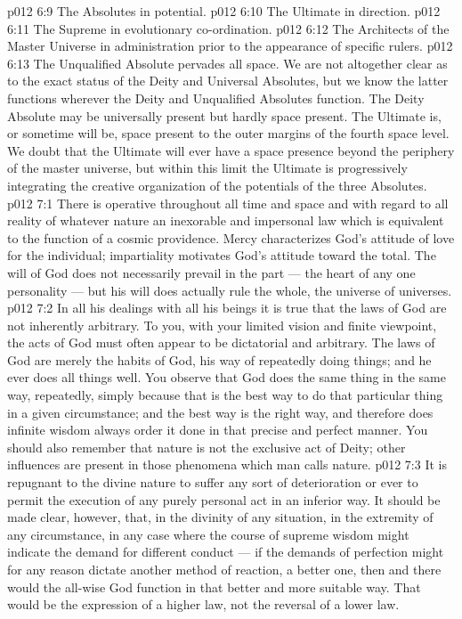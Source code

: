 \vs p012 6:9 \bibnobreakspace The Absolutes in potential.
\vs p012 6:10 \bibnobreakspace The Ultimate in direction.
\vs p012 6:11 \bibnobreakspace The Supreme in evolutionary co\hyp{}ordination.
\vs p012 6:12 \bibnobreakspace The Architects of the Master Universe in administration prior to the appearance of specific rulers.
\vs p012 6:13 \pc The Unqualified Absolute pervades all space. We are not altogether clear as to the exact status of the Deity and Universal Absolutes, but we know the latter functions wherever the Deity and Unqualified Absolutes function. The Deity Absolute may be universally present but hardly space present. The Ultimate is, or sometime will be, space present to the outer margins of the fourth space level. We doubt that the Ultimate will ever have a space presence beyond the periphery of the master universe, but within this limit the Ultimate is progressively integrating the creative organization of the potentials of the three Absolutes.
\vs p012 7:1 There is operative throughout all time and space and with regard to all reality of whatever nature an inexorable and impersonal law which is equivalent to the function of a cosmic providence. Mercy characterizes God’s attitude of love for the individual; impartiality motivates God’s attitude toward the total. The will of God does not necessarily prevail in the part --- the heart of any one personality --- but his will does actually rule the whole, the universe of universes.
\vs p012 7:2 \pc In all his dealings with all his beings it is true that the laws of God are not inherently arbitrary. To you, with your limited vision and finite viewpoint, the acts of God must often appear to be dictatorial and arbitrary. The laws of God are merely the habits of God, his way of repeatedly doing things; and he ever does all things well. You observe that God does the same thing in the same way, repeatedly, simply because that is the best way to do that particular thing in a given circumstance; and the best way is the right way, and therefore does infinite wisdom always order it done in that precise and perfect manner. You should also remember that nature is not the exclusive act of Deity; other influences are present in those phenomena which man calls nature.
\vs p012 7:3 It is repugnant to the divine nature to suffer any sort of deterioration or ever to permit the execution of any purely personal act in an inferior way. It should be made clear, however, that,  in the divinity of any situation, in the extremity of any circumstance, in any case where the course of supreme wisdom might indicate the demand for different conduct --- if the demands of perfection might for any reason dictate another method of reaction, a better one, then and there would the all\hyp{}wise God function in that better and more suitable way. That would be the expression of a higher law, not the reversal of a lower law.
